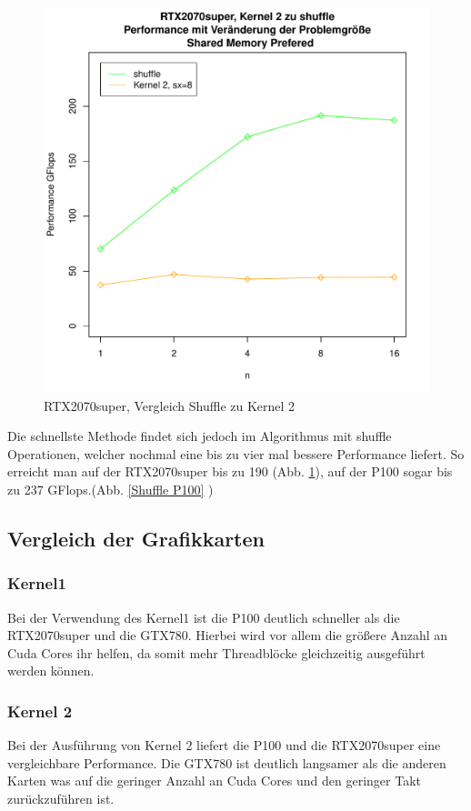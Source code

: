 \documentclass[10pt,a4paper]{article}
\begin{document}
	\begin{figure}
		\includegraphics[page=1,scale=0.8]{../Diagramme/shuffle.pdf}
		
		\caption{RTX2070super, Vergleich Shuffle zu Kernel 2 }
		\label{Shuffle RTX2070super}
	\end{figure}
		
	
	 Die schnellste Methode findet sich jedoch im Algorithmus mit shuffle Operationen, welcher nochmal eine bis zu vier mal bessere Performance liefert. So erreicht man auf der RTX2070super bis zu 190 (Abb. \ref{Shuffle RTX2070super}), auf der P100 sogar bis zu 237 GFlops.(Abb. \ref{Shuffle P100} )
	 \subsection{Vergleich der Grafikkarten}
	  \subsubsection{Kernel1}
	  Bei der Verwendung des Kernel1 ist die P100 deutlich schneller als die RTX2070super und die GTX780. Hierbei wird vor allem die größere Anzahl an Cuda Cores ihr helfen, da somit mehr Threadblöcke gleichzeitig ausgeführt werden können.
	  \subsubsection{Kernel 2}
	  Bei der Ausführung von Kernel 2 liefert die P100 und die RTX2070super eine vergleichbare Performance. 
	  Die GTX780 ist deutlich langsamer als die anderen Karten was auf die geringer Anzahl an Cuda Cores und den geringer Takt zurückzuführen ist.
\end{document}
